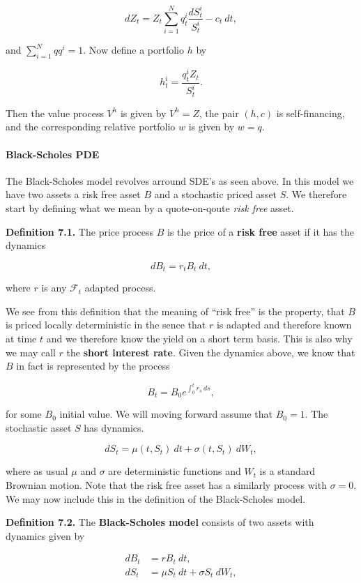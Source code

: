 \documentclass[
]{article}
\begin{document}
\[
dZ_t=Z_t\sum_{i=1}^N q_t^i\frac{dS_t^i}{S_t^i}-c_t\ dt,
\]

and \(\sum_{i=1}^Nqq^i=1\). Now define a portfolio \(h\) by

\[
h_t^i=\frac{q_t^iZ_t}{S_t^i}.
\]

Then the value process \(V^h\) is given by \(V^h=Z\), the pair \((h,c)\)
is self-financing, and the corresponding relative portfolio \(w\) is
given by \(w=q\).

\hypertarget{black-scholes-pde}{%
\paragraph{Black-Scholes PDE}\label{black-scholes-pde}}

The Black-Scholes model revolves arround SDE's as seen above. In this
model we have two assets a risk free asset \(B\) and a stochastic priced
asset \(S\). We therefore start by defining what we mean by a
quote-on-qoute \emph{risk free} asset.

\textbf{Definition 7.1.} The price process \(B\) is the price of a
\textbf{risk free} asset if it has the dynamics

\[
dB_t=r_t B_t\ dt,
\]

where \(r\) is any \(\mathcal{F}_t\) adapted process.

We see from this definition that the meaning of ``risk free'' is the
property, that \(B\) is priced locally deterministic in the sence that
\(r\) is adapted and therefore known at time \(t\) and we therefore know
the yield on a short term basis. This is also why we may call \(r\) the
\textbf{short interest rate}. Given the dynamics above, we know that
\(B\) in fact is represented by the process

\[
B_t=B_0e^{\int_0^tr_s\ ds},
\]

for some \(B_0\) initial value. We will moving forward assume that
\(B_0=1\). The stochastic asset \(S\) has dynamics.

\[
dS_t=\mu(t,S_t)\ dt + \sigma(t,S_t)\ dW_t,
\]

where as usual \(\mu\) and \(\sigma\) are deterministic functions and
\(W_t\) is a standard Brownian motion. Note that the risk free asset has
a similarly process with \(\sigma = 0\). We may now include this in the
definition of the Black-Scholes model.

\textbf{Definition 7.2.} The \textbf{Black-Scholes model} consists of
two assets with dynamics given by

\begin{align*}
dB_t&=rB_t\ dt,\\
dS_t&=\mu S_t\ dt+\sigma S_t\ dW_t,
\end{align*}
\end{document}
